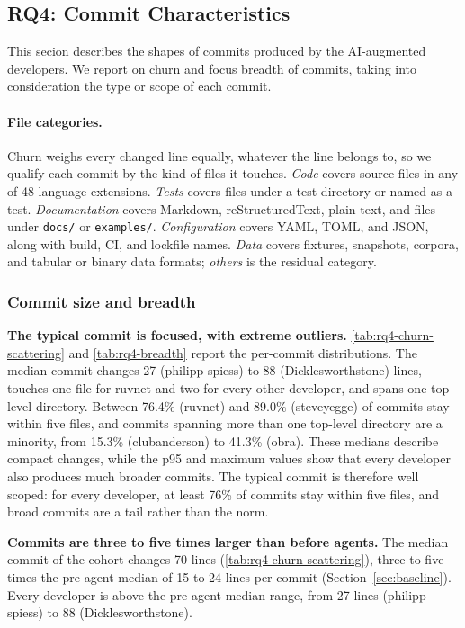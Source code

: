 \documentclass[smallextended]{svjour3}
\begin{document}
\subsection{RQ4: Commit Characteristics}
\label{sec:rq4-results}

This secion describes the shapes of commits produced by the AI-augmented developers. We report on churn and focus breadth of commits, taking into consideration the type or scope of each commit.

\paragraph{File categories.}
Churn weighs every changed line equally, whatever the line belongs to, so we
qualify each commit by the kind of files it touches.
\emph{Code} covers source files in any of 48 language extensions.
\emph{Tests} covers files under a test directory or named as a test.
\emph{Documentation} covers Markdown, reStructuredText, plain text, and files
under \texttt{docs/} or \texttt{examples/}.
\emph{Configuration} covers YAML, TOML, and JSON, along with build, CI, and
lockfile names.
\emph{Data} covers fixtures, snapshots, corpora, and tabular or binary data
formats; \emph{others} is the residual category.

\subsubsection{Commit size and breadth}

\textbf{The typical commit is focused, with extreme outliers.}
\autoref{tab:rq4-churn-scattering} and \autoref{tab:rq4-breadth} report the per-commit distributions.
The median commit changes 27 (philipp-spiess) to 88 (Dicklesworthstone) lines,
touches one file for ruvnet and two for every other developer, and spans one
top-level directory.
Between 76.4\% (ruvnet) and 89.0\% (steveyegge) of commits stay within five files, and commits spanning more than one top-level directory are a minority, from 15.3\% (clubanderson) to 41.3\% (obra).
These medians describe compact changes, while the p95 and maximum values show
that every developer also produces much broader commits.
The typical commit is therefore well scoped: for every developer, at least 76\% of commits stay within five files, and broad commits are a tail rather than the norm.

\textbf{Commits are three to five times larger than before agents.}
The median commit of the cohort changes 70 lines (\autoref{tab:rq4-churn-scattering}), three to five times the pre-agent median of 15 to 24 lines per commit (Section~\ref{sec:baseline}).
Every developer is above the pre-agent median range, from 27 lines (philipp-spiess) to 88 (Dicklesworthstone).
\end{document}
